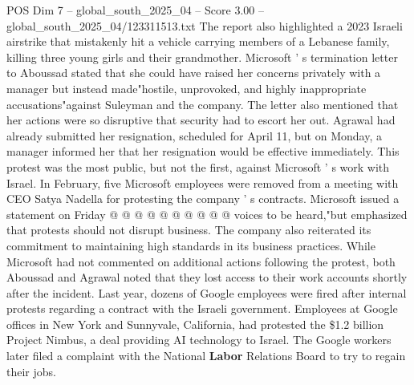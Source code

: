 \begin{textsample}{POS Dim 7 – global\_south\_2025\_04 – Score 3.00 – global\_south\_2025\_04/123311513.txt}
The report also highlighted a 2023 Israeli airstrike that mistakenly hit a vehicle carrying members of a Lebanese family, killing three young girls and their grandmother.
Microsoft ' s termination letter to Aboussad stated that she could have raised her concerns privately with a manager but instead made"hostile, unprovoked, and highly inappropriate accusations"against Suleyman and the company.
The letter also mentioned that her actions were so disruptive that security had to escort her out.
Agrawal had already submitted her resignation, scheduled for April 11, but on Monday, a manager informed her that her resignation would be effective immediately.
This protest was the most public, but not the first, against Microsoft ' s work with Israel.
In February, five Microsoft employees were removed from a meeting with CEO Satya Nadella for protesting the company ' s contracts.
Microsoft issued a statement on Friday @ @ @ @ @ @ @ @ @ @ voices to be heard,"but emphasized that protests should not disrupt business.
The company also reiterated its commitment to maintaining high standards in its business practices.
While Microsoft had not commented on additional actions following the protest, both Aboussad and Agrawal noted that they lost access to their work accounts shortly after the incident.
Last year, dozens of Google employees were fired after internal protests regarding a contract with the Israeli government.
Employees at Google offices in New York and Sunnyvale, California, had protested the \$1.2 billion Project Nimbus, a deal providing AI technology to Israel.
The Google workers later filed a complaint with the National \textbf{Labor} Relations Board to try to regain their jobs.

\end{textsample}
